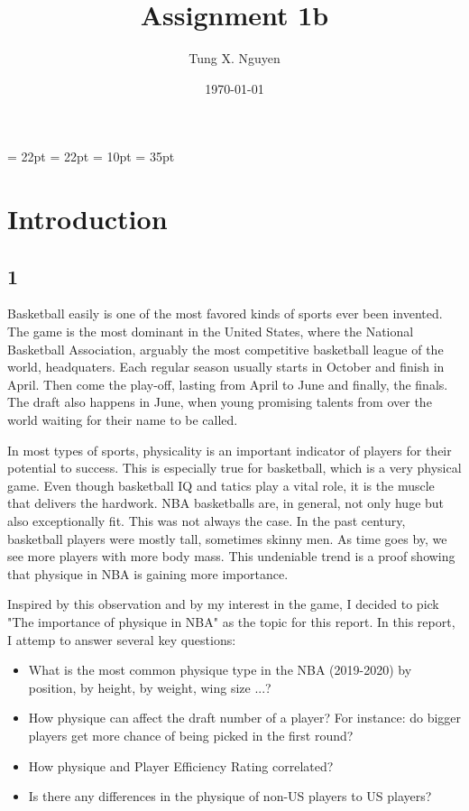 \documentclass[a4paper,12pt,twoside]{article}
\title{Assignment 1b}
\author{Tung X. Nguyen}
\date{\today}
\numberwithin{equation}{section}
\begin{document}
\maketitle
\thispagestyle{empty}

\tableofcontents
\listoffigures
\thispagestyle{empty}
\newpage

\oddsidemargin = 22pt
\evensidemargin = 22pt
\marginparsep = 10pt
\marginparwidth = 35pt


\section{Introduction}
\subsection*{1}
Basketball easily is one of the most favored kinds of sports ever been invented. The game is the most dominant in the United States, where the National Basketball Association, arguably the most competitive basketball league of the world, headquaters. Each regular season usually starts in October and finish in April. Then come the play-off, lasting from April to June and finally, the finals. The draft also happens in June, when young promising talents from over the world waiting for their name to be called.

In most types of sports, physicality is an important indicator of players for their potential to success. This is especially true for basketball, which is a very physical game. Even though basketball IQ and tatics play a vital role, it is the muscle that delivers the hardwork. NBA basketballs are, in general, not only huge but also exceptionally fit. This was not always the case. In the past century, basketball players were mostly tall, sometimes skinny men. As time goes by, we see more players with more body mass. This undeniable trend is a proof showing that physique in NBA is gaining more importance.

Inspired by this observation and by my interest in the game, I decided to pick "The importance of physique in NBA" as the topic for this report. In this report, I attemp to answer several key questions:
\begin{itemize}
\item What is the most common physique type in the NBA (2019-2020) by position, by height, by weight, wing size ...?
\item How physique can affect the draft number of a player? For instance: do bigger players get more chance of being picked in the first round?
\item How physique and Player Efficiency Rating correlated?
\item Is there any differences in the physique of non-US players to US players?
\end{itemize}
\end{document}

